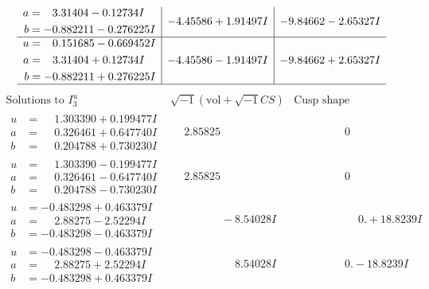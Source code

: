 \documentclass[1p]{elsarticle_modified}
\theoremstyle{definition}
\newcommand{\I}{\sqrt{-1}}
\begin{document}
$$\begin{array}{c|c|c}
\begin{aligned}
a &= \phantom{-}3.31404 - 0.12734 I \\
b &= -0.882211 - 0.276225 I\end{aligned}
 & -4.45586 + 1.91497 I & -9.84662 - 2.65327 I \\ \hline\begin{aligned}
u &= \phantom{-}0.151685 - 0.669452 I \\
a &= \phantom{-}3.31404 + 0.12734 I \\
b &= -0.882211 + 0.276225 I\end{aligned}
 & -4.45586 - 1.91497 I & -9.84662 + 2.65327 I\\
 \hline 
 \end{array}$$\newpage$$\begin{array}{c|c|c}  
\text{Solutions to }I^u_{3}& \I (\text{vol} + \sqrt{-1}CS) & \text{Cusp shape}\\
 \hline 
\begin{aligned}
u &= \phantom{-}1.303390 + 0.199477 I \\
a &= \phantom{-}0.326461 + 0.647740 I \\
b &= \phantom{-}0.204788 + 0.730230 I\end{aligned}
 & \phantom{-}2.85825\phantom{ +0.000000I} & \phantom{-0.000000 } 0 \\ \hline\begin{aligned}
u &= \phantom{-}1.303390 - 0.199477 I \\
a &= \phantom{-}0.326461 - 0.647740 I \\
b &= \phantom{-}0.204788 - 0.730230 I\end{aligned}
 & \phantom{-}2.85825\phantom{ +0.000000I} & \phantom{-0.000000 } 0 \\ \hline\begin{aligned}
u &= -0.483298 + 0.463379 I \\
a &= \phantom{-}2.88275 - 2.52294 I \\
b &= -0.483298 - 0.463379 I\end{aligned}
 & \phantom{-0.000000 } -8.54028 I & \phantom{-0.000000 -}0. + 18.8239 I \\ \hline\begin{aligned}
u &= -0.483298 - 0.463379 I \\
a &= \phantom{-}2.88275 + 2.52294 I \\
b &= -0.483298 + 0.463379 I\end{aligned}
 & \phantom{-0.000000 -}8.54028 I & \phantom{-0.000000 } 0. - 18.8239 I \\ \hline\begin{aligned}

\end{aligned}
\end{array}$$
\end{document}
